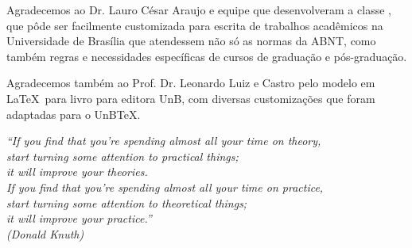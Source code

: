 \documentclass[
	12pt,				%
	openright,			%
	oneside,			%
	a4paper,			%
	english,			%
	brazil				%
	]{unbtex}
\begin{document}
\begin{agradecimentos}

Agradecemos ao Dr. Lauro César Araujo e equipe que desenvolveram a classe \abnTeX, que pôde ser facilmente customizada para escrita de trabalhos acadêmicos na Universidade de Brasília que atendessem não só as normas da ABNT, como também regras e necessidades específicas de cursos de graduação e pós-graduação.

Agradecemos também ao Prof. Dr. Leonardo Luiz e Castro pelo modelo em \LaTeX\ para livro para editora UnB, com diversas customizações que foram adaptadas para o UnB\TeX.


\end{agradecimentos}

\begin{epigrafe}
    \vspace*{\fill}
	\begin{flushright}
		\textit{``If you find that you're spending almost all your time on theory,\\ start turning some attention to practical things; \\ it will improve your theories.\\ If you find that you're spending almost all your time on practice, \\ start turning some attention to theoretical things; \\ it will improve your practice.''\\
		(Donald Knuth)}
	\end{flushright}
\end{epigrafe}

\end{document}
